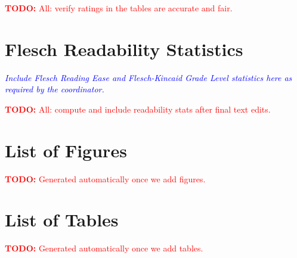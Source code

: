 \documentclass[12pt,oneside]{report}
\newcommand{\note}[1]{\textcolor{blue}{\textit{#1}}}
\newcommand{\todo}[1]{\textcolor{red}{\textbf{TODO:} #1}}
\begin{document}
\todo{All: verify ratings in the tables are accurate and fair.}

\chapter{Flesch Readability Statistics}
\note{Include Flesch Reading Ease and Flesch-Kincaid Grade Level statistics here as required by the coordinator.}

\todo{All: compute and include readability stats after final text edits.}

\chapter{List of Figures}
\todo{Generated automatically once we add figures.}

\chapter{List of Tables}
\todo{Generated automatically once we add tables.}
\end{document}
